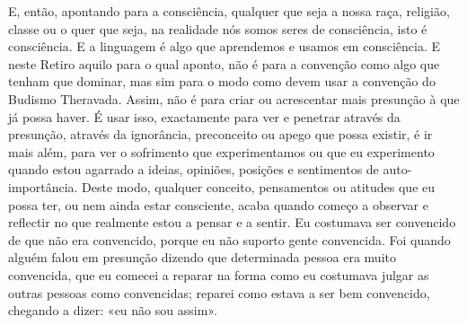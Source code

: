 E, então, apontando para a consciência, qualquer que seja a nossa raça,
religião, classe ou o quer que seja, na realidade nós somos seres de
consciência, isto é consciência. E a linguagem é algo que aprendemos e
usamos em consciência. E neste Retiro aquilo para o qual aponto, não é
para a convenção como algo que tenham que dominar, mas sim para o modo
como devem usar a convenção do Budismo Theravada. Assim, não é para
criar ou acrescentar mais presunção à que já possa haver. É usar isso,
exactamente para ver e penetrar através da presunção, através da
ignorância, preconceito ou apego que possa existir, é ir mais além, para
ver o sofrimento que experimentamos ou que eu experimento quando estou
agarrado a ideias, opiniões, posições e sentimentos de auto-importância.
Deste modo, qualquer conceito, pensamentos ou atitudes que eu possa ter,
ou nem ainda estar consciente, acaba quando começo a observar e
reflectir no que realmente estou a pensar e a sentir. Eu costumava ser
convencido de que não era convencido, porque eu não suporto gente
convencida. Foi quando alguém falou em presunção dizendo que determinada
pessoa era muito convencida, que eu comecei a reparar na forma como eu
costumava julgar as outras pessoas como convencidas; reparei como estava
a ser bem convencido, chegando a dizer: «eu não sou assim».

